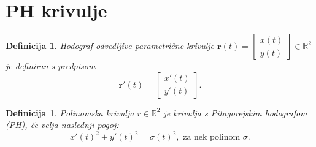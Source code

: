 \documentclass[12pt]{article}
\newtheorem{Definicija}[Izrek]{{\sc Definicija}}
\begin{document}
\section{PH krivulje}

\begin{Definicija}
	
	Hodograf odvedljive parametrične krivulje $\textbf{r}(t) = \begin{bmatrix} x(t) \\ y(t) \end{bmatrix} \in \mathbb{R}^2$ 
	je definiran s predpisom $$\textbf{r}'(t) = \begin{bmatrix} x'(t) \\ y'(t) \end{bmatrix}.$$
\end{Definicija}
\begin{Definicija}
	Polinomska krivulja $r \in \mathbb{R}^2$ je krivulja s Pitagorejskim hodografom (PH), če velja naslednji pogoj:
	$$x'(t)^2 + y'(t)^2 = \sigma(t)^2, \text{ za nek polinom } \sigma.$$
\end{Definicija}
\end{document}
